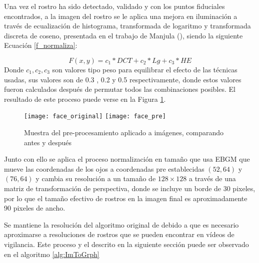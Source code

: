 Una vez el rostro ha sido detectado, validado y con los puntos fiduciales encontrados, a la imagen del rostro se le aplica una mejora en iluminación a través de ecualización de histograma, transformada de logaritmo y transformada discreta de coseno, presentada en el trabajo de Manjula (\cite{manjulaimage}), siendo la siguiente Ecuación \ref{f_normaliza}:

\begin{equation}
	F(x,y) = c_{1}*DCT + c_{2}*Lg + c_{3}*HE
    \label{f_normaliza}
\end{equation}
Donde $c_{1}, c_{2}, c_{3}$ son valores tipo peso para equilibrar el efecto de las técnicas usadas, sus valores son de 0.3 , 0.2 y 0.5 respectivamente, donde estos valores fueron calculados después de permutar todos las combinaciones posibles. El resultado de este proceso puede verse en la Figura \ref{im:Preprocess}.

\begin{figure}[h]
\center
\texttt{[image: face\_original]}
\texttt{[image: face\_pre]}
\caption{Muestra del pre-procesamiento aplicado a imágenes, comparando antes y después}
\label{im:Preprocess}
\end{figure}

Junto con ello se aplica el proceso normalización en tamaño que usa \ac{EBGM} que mueve las coordenadas de los ojos a coordenadas pre establecidas $(52, 64)$ y $(76, 64)$ y cambia su resolución a un tamaño de $128 \times 128$ a través de una matriz de transformación de  perspectiva, donde se incluye un borde de 30 pixeles, por lo que el tamaño efectivo de rostros en la imagen final es aproximadamente 90 pixeles de ancho.

Se mantiene la resolución del algoritmo original de \cite{bolme2003elastic} debido a que es necesario aproximarse a resoluciones de rostros que se pueden encontrar en vídeos de vigilancia.
Este proceso y el descrito en la siguiente sección puede ser observado en el algoritmo \ref{alg:ImToGrph}

